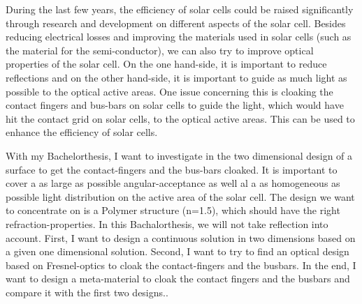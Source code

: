 During the last few years, the efficiency of solar cells could be raised significantly through research and development on different aspects of the solar cell. Besides reducing electrical losses and improving the materials used in solar cells (such as the material for the semi-conductor), we can also try to improve optical properties of the solar cell. On the one hand-side, it is important to reduce reflections and on the other hand-side, it is important to guide as much light as possible to the optical active areas. 
One issue concerning this is cloaking the contact fingers and bus-bars on solar cells to guide the light, which would have hit the contact grid on solar cells, to the optical active areas. This can be used to enhance the efficiency of solar cells. 

With my Bachelorthesis, I want to investigate in the two dimensional design of a surface to get the contact-fingers and the bus-bars cloaked. It is important to cover  a as large as possible angular-acceptance as well al a as homogeneous as possible light distribution on the active area of the solar cell. The design we want to concentrate on is a Polymer structure (n=1.5), which should have the right refraction-properties. In this Bachalorthesis, we will not take reflection into account. 
First, I want to design a continuous solution in two dimensions based on a given one dimensional solution. \cite{schumann2015cloaked}
Second, I want to try to find an optical design based on Fresnel-optics to cloak the contact-fingers and the busbars. 
In the end, I want to design a meta-material to cloak the contact fingers and the busbars and compare it with the first two designs.. 
